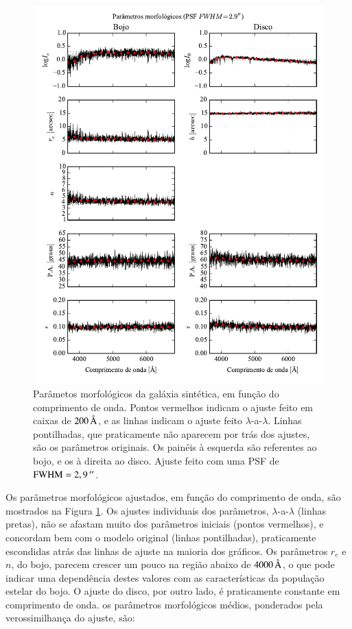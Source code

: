 \begin{figure}
	\includegraphics{figuras/simulation_fitparams}
	\caption[Parâmetos morfológicos da galáxia sintética.]
	{Parâmetos morfológicos da galáxia sintética, em função do comprimento de
	onda. Pontos vermelhos indicam o ajuste feito em caixas de $200\,\text{\normalfont\AA}$, e
	as linhas indicam o ajuste feito $\lambda$-a-$\lambda$. Linhas pontilhadas,
	que praticamente não aparecem por trás dos ajustes, são os parâmetros
	originais. Os painéis à esquerda são referentes ao bojo, e os à direita ao
	disco. Ajuste feito com uma PSF de $\mathrm{FWHM} = 2,9\,^{\prime\prime}$.
	}
	\label{fig:testFitParams}
\end{figure}

Os parâmetros morfológicos ajustados, em função do comprimento de onda, são
mostrados na Figura \ref{fig:testFitParams}. Os ajustes individuais dos
parâmetros, $\lambda$-a-$\lambda$ (linhas pretas), não se afastam muito dos
parâmetros iniciais (pontos vermelhos), e concordam bem com o modelo original
(linhas pontilhadas), praticamente escondidas atrás das linhas de ajuste na
maioria dos gráficos. Os parâmetros $r_e$ e $n$, do bojo, parecem crescer um
pouco na região abaixo de $4000\,\text{\normalfont\AA}$, o que pode indicar uma dependência
destes valores com as características da população estelar do bojo. O ajuste do
disco, por outro lado, é praticamente constante em comprimento de onda.
os parâmetros morfológicos médios, ponderados pela verossimilhança do ajuste,
são:

